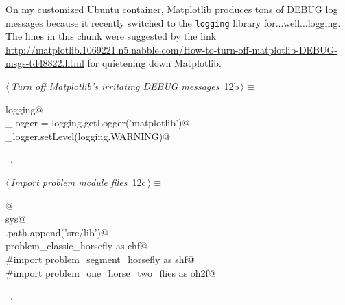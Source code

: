 \documentclass[11.5pt]{report}
\begin{document}
\newchunk On my customized Ubuntu container, Matplotlib produces tons of DEBUG log messages because  
it recently switched to the \verb|logging| library for...well...logging. 
The lines in this chunk were suggested by the link \url{http://matplotlib.1069221.n5.nabble.com/How-to-turn-off-matplotlib-DEBUG-msgs-td48822.html} 
for quietening down Matplotlib.  


\begin{flushleft} \small
\begin{minipage}{\linewidth}\label{scrap2}\raggedright\small
{} $\langle\,${\itshape Turn off Matplotlib's irritating DEBUG messages}\nobreak\ {\footnotesize {12b}}$\,\rangle\equiv$
\vspace{-1ex}
\begin{list}{}{} \item
\mbox{}\verb@import logging@\\
\mbox{}\verb@mpl_logger = logging.getLogger('matplotlib')@\\
\mbox{}\verb@mpl_logger.setLevel(logging.WARNING)@\\
\mbox{}\verb@@{\NWsep}
\end{list}
\vspace{-1.5ex}
\footnotesize
\begin{list}{}{\setlength{\itemsep}{-\parsep}\setlength{\itemindent}{-\leftmargin}}
\item \NWtxtMacroRefIn\ .

\item{}
\end{list}
\end{minipage}\vspace{4ex}
\end{flushleft}
\begin{flushleft} \small
\begin{minipage}{\linewidth}\label{scrap3}\raggedright\small
{} $\langle\,${\itshape Import problem module files}\nobreak\ {\footnotesize {12c}}$\,\rangle\equiv$
\vspace{-1ex}
\begin{list}{}{} \item
\mbox{}\verb@   @\\
\mbox{}\verb@import sys@\\
\mbox{}\verb@sys.path.append('src/lib')@\\
\mbox{}\verb@import problem_classic_horsefly as chf@\\
\mbox{}\verb@#import problem_segment_horsefly as shf@\\
\mbox{}\verb@#import problem_one_horse_two_flies as oh2f@\\
\mbox{}\verb@@{\NWsep}
\end{list}
\vspace{-1.5ex}
\footnotesize
\begin{list}{}{\setlength{\itemsep}{-\parsep}\setlength{\itemindent}{-\leftmargin}}
\item \NWtxtMacroRefIn\ .

\item{}
\end{list}
\end{minipage}\vspace{4ex}
\end{flushleft}
\end{document}
